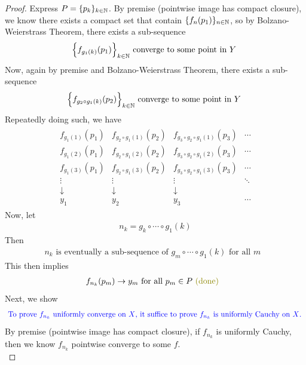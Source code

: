 \documentclass{report}
\begin{document}
\begin{proof}
Express $P=\{ p_k \}_{k\in\mathbb{N}}$. By premise (pointwise image has compact closure), we know there exists a compact set that contain $\{ f_n(p_1) \}_{n\in\mathbb{N}}$, so by Bolzano-Weierstrass Theorem, there exists a sub-sequence 
\begin{align*}
\Big\{ f_{g_1(k)}(p_1) \Big\}_{k\in\mathbb{N}}\text{ converge to some point in $Y$ }
\end{align*}
Now, again by premise and Bolzano-Weierstrass Theorem, there exists a sub-sequence 
\begin{align*}
\Big\{ f_{g_2\circ g_1(k)}(p_2) \Big\}_{k\in\mathbb{N}}\text{ converge to some point in $Y$ }
\end{align*}
Repeatedly doing such, we have 
\begin{align*}
\begin{matrix} 
  f_{g_1(1)}(p_1) & f_{g_2\circ g_1 (1)}(p_2) & f_{g_3\circ g_2 \circ  g_1 (1)}(p_3) & \cdots \\
  f_{g_1(2)}(p_1) & f_{g_2\circ g_1 (2)}(p_2) & f_{g_3\circ g_2 \circ  g_1 (2)}(p_3) & \cdots \\
  f_{g_1(3)}(p_1) & f_{g_2\circ g_1 (3)}(p_2) & f_{g_3\circ g_2 \circ  g_1 (3)}(p_3) & \cdots \\
  \vdots &\vdots &\vdots & \ddots\\
  \downarrow & \downarrow &\downarrow &\\
  y_1 & y_2 & y_3 & \cdots 
\end{matrix}
\end{align*}
Now, let 
 \begin{align*}
n_k=g_k\circ \cdots \circ g_1(k)
\end{align*}
Then 
\begin{align*}
n_k\text{ is eventually a sub-sequence of $g_m\circ \cdots \circ g_1(k)$ for all $m$ }
\end{align*}
This then implies 
\begin{align*}
f_{n_k}(p_m)\to y_m\text{ for all $p_m \in P \odone$ }
\end{align*}
Next, we show 
\begin{align*}
\textcolor{blue}{\text{ To prove $f_{n_k}$ uniformly converge on $X$, it suffice to prove $f_{n_k}$ is uniformly Cauchy on $X$. }}
\end{align*}
By premise (pointwise image has compact closure), if $f_{n_k}$ is uniformly Cauchy, then we know $f_{n_k}$ pointwise converge to some $f$.\\


\end{proof}
\end{document}
